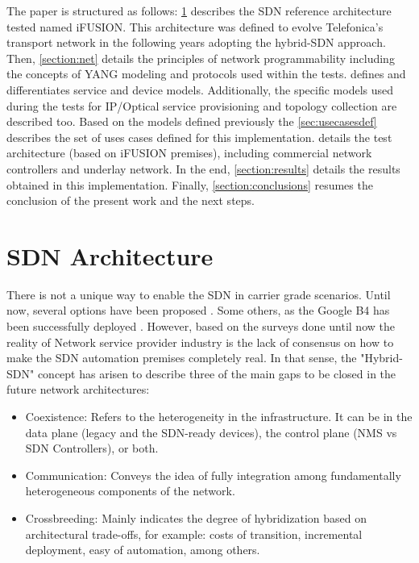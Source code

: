\documentclass[a4paper,fleqn]{cas-dc}
\begin{document}
The paper is structured as follows: \cref{section:arq} describes the SDN reference architecture tested named iFUSION. This architecture was defined to evolve Telefonica's transport network in the following years adopting the hybrid-SDN approach. Then, \cref{section:net} details the principles of network programmability including the concepts of YANG modeling and protocols used within the tests.  defines and differentiates service and device models. Additionally, the specific models used during the tests for IP/Optical service provisioning and topology collection are described too. Based on the models defined previously the \cref{sec:usecasesdef} describes the set of uses cases defined for this implementation.  details the test architecture (based on iFUSION premises), including commercial network controllers and underlay network. In the end, \cref{section:results}  details the results obtained in this implementation. Finally, \cref{section:conclusions} resumes the conclusion of the present work and the next steps.

\section{SDN Architecture}
\label{section:arq}

There is not a unique way to enable the SDN in carrier grade scenarios. Until now, several options have been proposed \cite{bakshi2013considerations,karakus2017survey,birk2016evolving}. Some others, as the Google B4 has been successfully deployed \cite{jain2013b4}. However, based on the surveys done until now \cite{campbell1999survey,sinha2017survey,boucadair2014software} the reality of Network service provider industry is the lack of consensus on how to make the SDN automation premises completely real. In that sense, the "Hybrid-SDN" concept has arisen to describe three of the main gaps to be closed in the future network architectures: 
\begin{itemize}
    \item Coexistence: Refers to the heterogeneity in the infrastructure. It can be in the data plane (legacy and the SDN-ready devices), the control plane (NMS vs SDN Controllers), or both. 
    \item Communication: Conveys the idea of fully integration among fundamentally heterogeneous components of the network.
    \item Crossbreeding: Mainly indicates the degree of hybridization based on architectural trade-offs, for example: costs of transition, incremental deployment, easy of automation, among others. 
\end{itemize}
\end{document}

